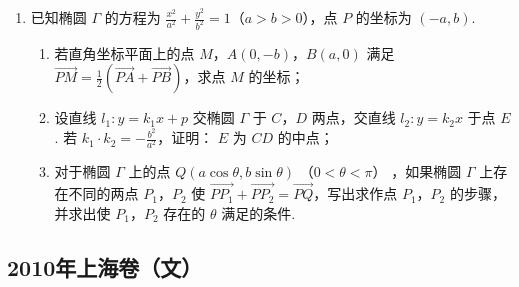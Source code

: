 \begin{description}
\begin{enumerate}[leftmargin=5pt]
        \item 已知椭圆 \(\Gamma\) 的方程为 \(\frac{x^2}{a^2} + \frac{y^2}{b^2} = 1\)（\(a > b > 0\)），点 \(P\) 的坐标为 \((-a, b)\).

\begin{enumerate}
\item 若直角坐标平面上的点 \(M\)，\(A(0, -b)\)，\(B(a, 0)\) 满足 \(\overrightarrow{PM} = \frac{1}{2} (\overrightarrow{PA} + \overrightarrow{PB})\)，求点 \(M\) 的坐标；
\item 设直线 \(l_1: y = k_1x + p\) 交椭圆 \(\Gamma\) 于 \(C\)，\(D\) 两点，交直线 \(l_2: y = k_2x\) 于点 \(E\). 若 \(k_1 \cdot k_2 = -\frac{b^2}{a^2}\)，证明： \(E\) 为 \(CD\) 的中点；
\item 对于椭圆 \(\Gamma\) 上的点 \(Q(a\cos \theta, b\sin \theta)\) （\(0 < \theta < \pi\)） ，如果椭圆 \(\Gamma\) 上存在不同的两点 \(P_1\)，\(P_2\) 使 \(\overrightarrow{PP_1} + \overrightarrow{PP_2} = \overrightarrow{PQ}\)，写出求作点 \(P_1\)，\(P_2\) 的步骤，并求出使 \(P_1\)，\(P_2\) 存在的 \(\theta\) 满足的条件.
\end{enumerate}

    \end{enumerate}

\end{description}


\subsection{2010年上海卷（文）}\label{gk:2010年上海卷（文）}

